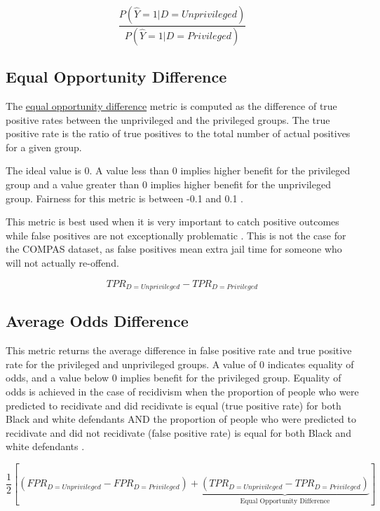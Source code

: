 \documentclass[,article,,moreauthors,pdftex]{mdpi}
\begin{document}
\[\frac{P(\hat{Y}=1|D=Unprivileged)}{P(\hat{Y}=1|D=Privileged)}\]

\hypertarget{equal-opportunity-difference}{%
\subsection{Equal Opportunity
Difference}\label{equal-opportunity-difference}}

The
\href{https://developers.google.com/machine-learning/glossary/fairness\#e}{equal
opportunity difference} metric is computed as the difference of true
positive rates between the unprivileged and the privileged groups. The
true positive rate is the ratio of true positives to the total number of
actual positives for a given group.

The ideal value is 0. A value less than 0 implies higher benefit for the
privileged group and a value greater than 0 implies higher benefit for
the unprivileged group. Fairness for this metric is between -0.1 and 0.1
\citep{aif360-oct-2018}.

This metric is best used when it is very important to catch positive
outcomes while false positives are not exceptionally problematic
\citep{Cortez2019How}. This is not the case for the COMPAS dataset, as
false positives mean extra jail time for someone who will not actually
re-offend.

\[TPR_{D = Unprivileged} - TPR_{D = Privileged}\]

\hypertarget{average-odds-difference}{%
\subsection{Average Odds Difference}\label{average-odds-difference}}

This metric returns the average difference in false positive rate and
true positive rate for the privileged and unprivileged groups. A value
of 0 indicates equality of odds, and a value below 0 implies benefit for
the privileged group. Equality of odds is achieved in the case of
recidivism when the proportion of people who were predicted to
recidivate and did recidivate is equal (true positive rate) for both
Black and white defendants AND the proportion of people who were
predicted to recidivate and did not recidivate (false positive rate) is
equal for both Black and white defendants \citep{aif360-oct-2018}.

\[\frac{1}{2}\left[(FPR_{D = Unprivileged} - FPR_{D = Privileged}) + \underbrace{(TPR_{D = Unprivileged} - TPR_{D = Privileged})}_\textrm{Equal Opportunity Difference}\right]\]
\end{document}
